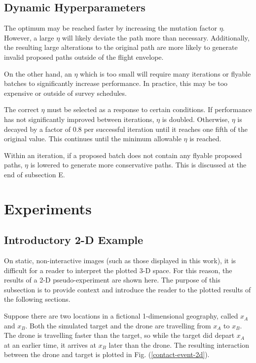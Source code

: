 \documentclass[conf]{new-aiaa}
\begin{document}
\subsection{Dynamic Hyperparameters}
The optimum may be reached faster by increasing the mutation factor $\eta$. However, a large $\eta$ will likely deviate the path more than necessary. Additionally, the resulting large alterations to the original path are more likely to generate invalid proposed paths outside of the flight envelope.

On the other hand, an $\eta$ which is too small will require many iterations or flyable batches to significantly increase performance. In practice, this may be too expensive or outside of survey schedules.

The correct $\eta$ must be selected as a response to certain conditions. If performance has not significantly improved between iterations, $\eta$ is doubled. Otherwise, $\eta$ is decayed by a factor of 0.8 per successful iteration until it reaches one fifth of the original value. This continues until the minimum allowable $\eta$ is reached.

Within an iteration, if a proposed batch does not contain any flyable proposed paths, $\eta$ is lowered to generate more conservative paths. This is discussed at the end of subsection E.






\section{Experiments}

\subsection{Introductory 2-D Example}
On static, non-interactive images (such as those displayed in this work), it is difficult for a reader to interpret the plotted 3-D space. For this reason, the results of a 2-D pseudo-experiment are shown here. The purpose of this subsection is to provide context and introduce the reader to the plotted results of the following sections.

Suppose there are two locations in a fictional 1-dimensional geography, called $x_A$ and $x_B$. Both the simulated target and the drone are travelling from $x_A$ to $x_B$. The drone is travelling faster than the target, so while the target did depart $x_A$ at an earlier time, it arrives at $x_B$ later than the drone. The resulting interaction between the drone and target is plotted in Fig. (\ref{contact-event-2d}).
\end{document}
